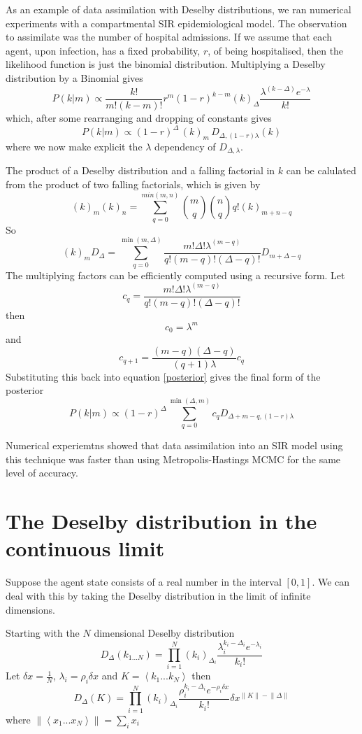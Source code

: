 \documentclass[letterpaper,twocolumn,10pt]{article}
\begin{document}
As an example of data assimilation with Deselby distributions, we ran numerical experiments with a compartmental SIR epidemiological model. The observation to assimilate was the number of hospital admissions. If we assume that each agent, upon infection, has a fixed probability, $r$, of being hospitalised, then the likelihood function is just the binomial distribution. Multiplying a Deselby distribution by a Binomial gives
\[
P(k|m) \propto \frac{k!}{m!(k-m)!}r^m(1-r)^{k-m} (k)_\Delta \frac{\lambda^{(k-\Delta)}e^{-\lambda}}{k!}
\]
which, after some rearranging and dropping of constants gives
\begin{equation}
P(k|m) \propto (1-r)^\Delta \, (k)_m \,D_{\Delta,(1-r)\lambda}(k)
\label{posterior}
\end{equation}
where we now make explicit the $\lambda$ dependency of $D_{\Delta,\lambda}$.

The product of a Deselby distribution and a falling factorial in $k$ can be calulated from the product of two falling factorials, which is given by
\[
(k)_m(k)_n = \sum_{q=0}^{min(m,n)} {m \choose q}{n \choose q}q!(k)_{m+n-q}
\]
So
\[
(k)_m D_\Delta = \sum_{q=0}^{\min(m,\Delta)} \frac{m!\Delta!\lambda^{(m-q)}}{q!(m-q)!(\Delta-q)!} D_{m+\Delta-q}
\]
The multiplying factors can be efficiently computed using a recursive form. Let
\[
c_q = \frac{m!\Delta!\lambda^{(m-q)}}{q!(m-q)!(\Delta-q)!}
\]
then
\[
c_0 = \lambda^m
\]
and
\[
c_{q+1} = \frac{(m-q)(\Delta - q)}{(q+1)\lambda} c_q
\]
Substituting this back into equation \ref{posterior} gives the final form of the posterior
\begin{equation}
P(k|m) \propto (1-r)^\Delta \sum_{q=0}^{\min(\Delta,m)} c_q D_{\Delta+m-q,(1-r)\lambda}
\end{equation}

Numerical experiemtns showed that data assimilation into an SIR model using this technique was faster than using Metropolis-Hastings MCMC for the same level of accuracy.


\section{The Deselby distribution in the continuous limit}

Suppose the agent state consists of a real number in the interval $[0,1]$. We can deal with this by taking the Deselby distribution in the limit of infinite dimensions.

Starting with the $N$ dimensional Deselby distribution
\[
D_\Delta(k_{1...N}) = \prod_{i=1}^N (k_i)_{\Delta_i}\frac{\lambda_i^{k_i-\Delta_i}e^{-\lambda_i}}{k_i!}
\]
Let $\delta x = \frac{1}{N}$, $\lambda_i = \rho_i \delta x$  and $K = \left< k_1...k_N \right>$ then
\begin{equation}
D_\Delta(K) = \prod_{i=1}^N (k_i)_{\Delta_i}\frac{\rho_i^{k_i-\Delta_i}e^{-\rho_i \delta x}}{k_i!} \delta x^{\lVert K\rVert - \lVert \Delta \rVert}
\label{continuousDeselby}
\end{equation}
where $\lVert \left<x_1...x_N \right> \rVert = \sum_i x_i$
\end{document}
